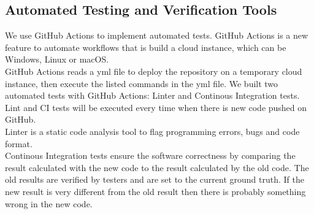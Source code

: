 \documentclass[12pt, titlepage]{article}
\begin{document}


\subsection{Automated Testing and Verification Tools}


We use GitHub Actions to implement automated tests. GitHub Actions is a new feature to automate workflows that is build a cloud instance, which can be Windows, Linux or macOS. \\

\noindent GitHub Actions reads a yml file to deploy the repository on a temporary cloud instance, then execute the listed commands in the yml file. We built two automated tests with GitHub Actions: Linter and Continous Integration tests. Lint and CI tests will be executed every time when there is new code pushed on GitHub.\\

\noindent Linter is a static code analysis tool to flag programming errors, bugs and code format. \\

\noindent Continous Integration tests ensure the software correctness by comparing the result calculated with the new code to the result calculated by the old code. The old results are verified by testers and are set to the current ground truth. If the new result is very different from the old result then there is probably something wrong in the new code.\\
\end{document}
